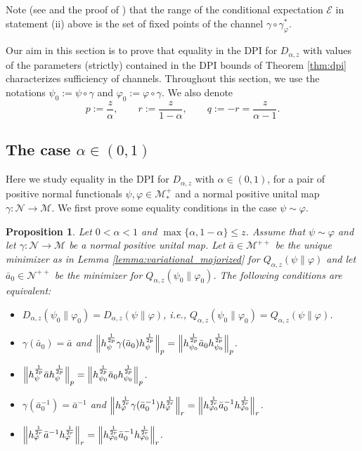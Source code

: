 \documentclass[12pt]{article}
\newtheorem{prop}[theorem]{Proposition}
\theoremstyle{definition}
\theoremstyle{remark}
\numberwithin{equation}{section}
\def\Me{\mathcal M}
\def\Ne{\mathcal N}
\def\ffi{\varphi}
\begin{document}
Note (see \cite[Theorem 2]{petz1988sufficiency} and the proof of
\cite[Theorem 3]{petz1988sufficiency})
that the range of the conditional expectation $\mathcal E$ in statement (ii) above is the set of
fixed points of the channel $\gamma\circ\gamma_\varphi^*$.


Our aim in this section is to prove that equality in the DPI for $D_{\alpha,z}$ with 
values of the parameters (strictly) contained in the DPI bounds of Theorem \ref{thm:dpi}
characterizes sufficiency of channels. Throughout this section, we use the
notations $\psi_0:=\psi\circ\gamma$ and $\ffi_0:=\ffi\circ\gamma$. We also denote
\[
p:=\frac{z}{\alpha},\qquad r:=\frac{z}{1-\alpha},\qquad q:=-r=\frac{z}{\alpha-1}. 
\]


\subsection{The case $\alpha\in (0,1)$}

Here we study equality in the DPI for $D_{\alpha,z}$ with $\alpha\in (0,1)$,  for a pair of positive
normal functionals $\psi,\ffi\in \Me_*^+$ and a normal positive unital map $\gamma:\Ne\to \Me$. We first
prove some equality conditions  in the case $\psi\sim \ffi$. 

\begin{prop}\label{prop:DPI_equality}
Let $0<\alpha<1$ and $\max\{\alpha,1-\alpha\}\le z$.  Assume that $\psi\sim \ffi$ and  let
$\gamma:\Ne\to \Me$ be a normal positive unital map. Let 
$\bar a\in \Me^{++}$  
be the unique minimizer as in Lemma \ref{lemma:variational_majorized} for
$Q_{\alpha,z}(\psi\|\ffi)$ and let $\bar a_0\in \Ne^{++}$ be the minimizer for
$Q_{\alpha,z}(\psi_0\|\ffi_0)$. The following conditions are equivalent:
\begin{itemize}
\item[(i)] $D_{\alpha,z}(\psi_0\|\ffi_0)=D_{\alpha,z}(\psi\|\ffi)$, i.e.,
$Q_{\alpha,z}(\psi_0\|\ffi_0)=Q_{\alpha,z}(\psi\|\ffi)$.
\item[(ii)] $\gamma(\bar a_0)=\bar a$ and
$\Big\|h_\psi^{1\over2p}\gamma(\bar a_0)h_\psi^{1\over2p}\Big\|_{p}
=\Big\|h_{\psi_0}^{1\over2p}\bar a_0h_{\psi_0}^{1\over2p}\Big\|_{p}$.
\item[(iii)] $\Big\|h_\psi^{1\over2p}\bar ah_\psi^{1\over2p}\Big\|_{p}
=\Big\|h_{\psi_0}^{1\over2p}\bar a_0h_{\psi_0}^{1\over2p}\Big\|_{p}$.
\item[(iv)] $\gamma(\bar a_0^{-1})=\bar a^{-1}$ and
$\Big\|h_\ffi^{1\over2r}\gamma(\bar a_0^{-1})h_\ffi^{1\over2r}\Big\|_{r}
=\Big\|h_{\ffi_0}^{1\over2r}\bar a_0^{-1}h_{\ffi_0}^{1\over2r}\Big\|_{r}$.
\item[(v)] $\Big\|h_\ffi^{1\over2r}\bar a^{-1}h_\ffi^{1\over2r}\Big\|_{r}
=\Big\|h_{\ffi_0}^{1\over2r}\bar a_0^{-1}h_{\ffi_0}^{1\over2r}\Big\|_{r}$.
\end{itemize}
\end{prop}
\end{document}
